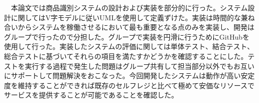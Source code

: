 　本論文では商品識別システムの設計および実装を部分的に行った。システム設計に関してはV字モデルに従いUMLを使用して定義ずけた。実装は時間的な兼ね合いからシステムを稼働させるにおいて最も重要となる点のみを実装し、開発はグループで行ったので分担した。グループで実装を円滑に行うためにGitHubを使用して行った。実装したシステムの評価に関しては単体テスト、結合テスト、総合テストに基づいてそれらの項目を満たすかどうかを確認することにした。テストを実行する過程で発生した問題はグループ共有して担当部分以外でもお互いにサポートして問題解決をおこなった。今回開発したシステムは動作が高い安定度を維持することができれば既存のセルフレジと比べて極めて安価なリソースでサービスを提供することが可能であることを確認した。